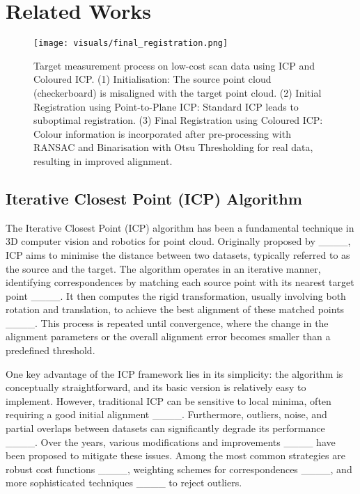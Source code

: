 \section{Related Works}
\label{RELATED_WORKS}
\begin{figure*}[t]
  \centering
    \texttt{[image: visuals/final\_registration.png]}
    \caption{Target measurement process on low-cost scan data using ICP and Coloured ICP. (1) Initialisation: The source point cloud (checkerboard) is misaligned with the target point cloud. (2) Initial Registration using Point-to-Plane ICP: Standard ICP leads to suboptimal registration. (3) Final Registration using Coloured ICP: Colour information is incorporated after pre-processing with RANSAC and Binarisation with Otsu Thresholding for real data, resulting in improved alignment.}
    \label{fig:Registration_visualisation}
\end{figure*}

\subsection{Iterative Closest Point (ICP) Algorithm}
The Iterative Closest Point (ICP) algorithm has been a fundamental technique in 3D computer vision and robotics for point cloud. Originally proposed by ____, ICP aims to minimise the distance between two datasets, typically referred to as the source and the target. The algorithm operates in an iterative manner, identifying correspondences by matching each source point with its nearest target point ____. It then computes the rigid transformation, usually involving both rotation and translation, to achieve the best alignment of these matched points ____. This process is repeated until convergence, where the change in the alignment parameters or the overall alignment error becomes smaller than a predefined threshold.

One key advantage of the ICP framework lies in its simplicity: the algorithm is conceptually straightforward, and its basic version is relatively easy to implement. However, traditional ICP can be sensitive to local minima, often requiring a good initial alignment ____. Furthermore, outliers, noise, and partial overlaps between datasets can significantly degrade its performance ____. Over the years, various modifications and improvements ____ have been proposed to mitigate these issues. Among the most common strategies are robust cost functions ____, weighting schemes for correspondences ____, and more sophisticated techniques ____ to reject outliers. 

